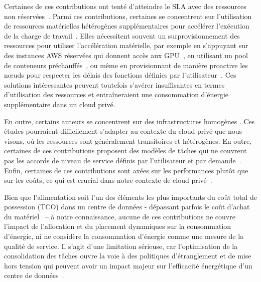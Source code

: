 Certaines de ces contributions ont tenté d'atteindre le SLA avec des ressources non réservées~\cite{gujaratiSwayamDistributedAutoscaling2017, zhangMArkExploitingCloud, mampageDeadlineawareDynamicResource2021, singhviAtollScalableLowLatency2021, handaoui2020releaser, handaoui2020salamander, yalles2022riscless}.
Parmi ces contributions, certaines se concentrent sur l'utilisation de ressources matérielles hétérogènes supplémentaires pour accélérer l'exécution de la charge de travail~\cite{zhangMArkExploitingCloud, lingPigeonDynamicEfficient2019, yangINFlessNativeServerless2022}.
Elles nécessitent souvent un surprovisionnement des ressources pour utiliser l'accélération matérielle, par exemple en s'appuyant sur des instances AWS réservées qui donnent accès aux GPU~\cite{zhangMArkExploitingCloud}, en utilisant un pool de conteneurs préchauffés~\cite{lingPigeonDynamicEfficient2019}, ou même en provisionnant de manière proactive les nœuds pour respecter les délais des fonctions définies par l'utilisateur~\cite{singhviAtollScalableLowLatency2021}. Ces solutions intéressantes peuvent toutefois s'avérer insuffisantes en termes d'utilisation des ressources et entraîneraient une consommation d'énergie supplémentaire dans un cloud privé.

En outre, certains auteurs se concentrent sur des infrastructures homogènes \cite{gujaratiSwayamDistributedAutoscaling2017, sureshENSUREEfficientScheduling2020, mampageDeadlineawareDynamicResource2021, singhviAtollScalableLowLatency2021, yangINFlessNativeServerless2022}. Ces études pourraient difficilement s'adapter au contexte du cloud privé que nous visons, où les ressources sont généralement transitoires et hétérogènes. En outre, certaines de ces contributions proposent des modèles de tâches qui ne couvrent pas les accords de niveau de service définis par l'utilisateur et par demande~\cite{sureshENSUREEfficientScheduling2020, lingPigeonDynamicEfficient2019}. Enfin, certaines de ces contributions sont axées sur les performances plutôt que sur les coûts, ce qui est crucial dans notre contexte de cloud privé~\cite{gujaratiSwayamDistributedAutoscaling2017, lingPigeonDynamicEfficient2019, singhviAtollScalableLowLatency2021, choSLADrivenMLInference}.

Bien que l'alimentation soit l'un des éléments les plus importants du coût total de possession (TCO) dans un centre de données - dépassant parfois le coût d'achat du matériel~\cite{7279063} -- à notre connaissance, aucune de ces contributions ne couvre l'impact de l'allocation et du placement dynamiques sur la consommation d'énergie, ni ne considère la consommation d'énergie comme une mesure de la qualité de service. Il s'agit d'une limitation sérieuse, car l'optimisation de la consolidation des tâches ouvre la voie à des politiques d'étranglement et de mise hors tension qui peuvent avoir un impact majeur sur l'efficacité énergétique d'un centre de données~\cite{chaurasiaComprehensiveSurveyEnergyaware2021}.


